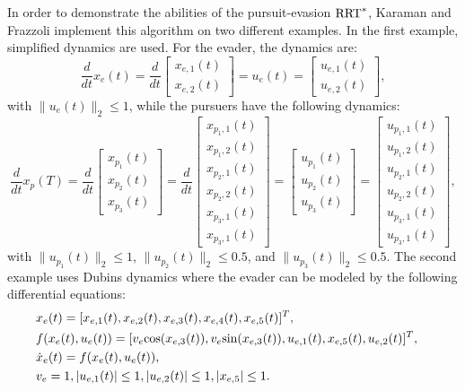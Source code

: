 In order to demonstrate the abilities of the pursuit-evasion $\textnormal{RRT}^*$, Karaman and Frazzoli implement this algorithm on two different examples. In the first example, simplified dynamics are used. For the evader, the dynamics are:
\begin{equation*}
\dfrac{d}{dt}x_e(t) = \dfrac{d}{dt}\left[ \begin{array}{c}
x_{e,1}(t) \\
x_{e,2}(t) \end{array} \right] = u_e(t) = \left[ \begin{array}{c}
u_{e,1}(t) \\
u_{e,2}(t) \end{array} \right],
\end{equation*}
with $\|u_e(t)\|_2 \leq 1$, while the pursuers have the following dynamics:
\begin{equation*}
\dfrac{d}{dt}x_p(T) = \dfrac{d}{dt}\left[ \begin{array}{c}
x_{p_1}(t) \\
x_{p_2}(t) \\
x_{p_3}(t) \end{array} \right] = \dfrac{d}{dt}\left[ \begin{array}{c}
x_{p_1,1}(t) \\
x_{p_1,2}(t) \\
x_{p_2,1}(t) \\
x_{p_2,2}(t) \\
x_{p_3,1}(t) \\
x_{p_3,1}(t) \end{array} \right] =
\left[ \begin{array}{c}
u_{p_1}(t) \\
u_{p_2}(t) \\
u_{p_3}(t) \end{array} \right] = \left[ \begin{array}{c}
u_{p_1,1}(t) \\
u_{p_1,2}(t) \\
u_{p_2,1}(t) \\
u_{p_2,2}(t) \\
u_{p_3,1}(t) \\
u_{p_3,1}(t) \end{array} \right],
\end{equation*}                   
with $\|u_{p_1}(t)\|_2 \leq 1$, $\|u_{p_2}(t)\|_2 \leq 0.5$, and $\|u_{p_3}(t)\|_2 \leq 0.5$. The second example uses Dubins dynamics where the evader can be modeled by the following differential equations:
\begin{align*}
& x_e(t) = [x_{e,1}(t),x_{e,2}(t),x_{e,3}(t),x_{e,4}(t),x_{e,5}(t)]^T , & \\
& f(x_e(t),u_e(t)) = [v_e \textnormal{cos}(x_{e,3}(t)),v_e \textnormal{sin}(x_{e,3}(t)),u_{e,1}(t),x_{e,5}(t),u_{e,2}(t)]^T , &\\
& \dot{x}_e(t) = f(x_e(t),u_e(t)), & \\
& v_e = 1, |u_{e,1}(t)| \leq 1, |u_{e,2}(t)| \leq 1, |x_{e,5}| \leq 1. &
\end{align*} 
